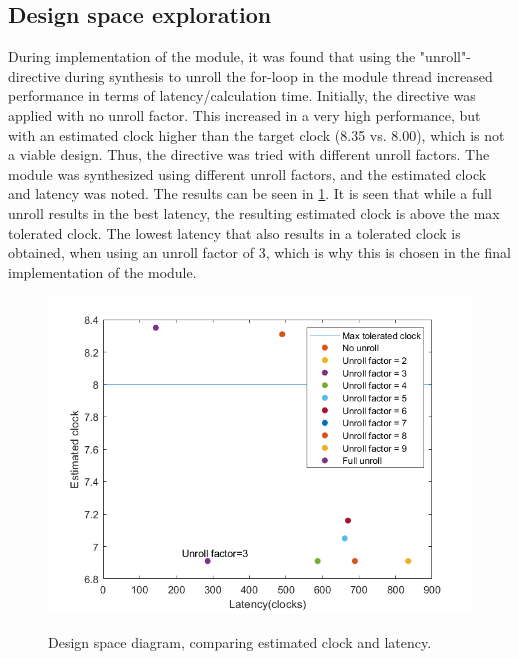 \subsection{Design space exploration}
During implementation of the module, it was found that using the "unroll"-directive during synthesis to unroll the for-loop in the module thread increased performance in terms of latency/calculation time. Initially, the directive was applied with no unroll factor. This increased in a very high performance, but with an estimated clock higher than the target clock (8.35 vs. 8.00), which is not a viable design. Thus, the directive was tried with different unroll factors. The module was synthesized using different unroll factors, and the estimated clock and latency was noted. The results can be seen in \cref{fig:design_space_diagram}. It is seen that while a full unroll results in the best latency, the resulting estimated clock is above the max tolerated clock. The lowest latency that also results in a tolerated clock is obtained, when using an unroll factor of 3, which is why this is chosen in the final implementation of the module.
\begin{figure}[H]
	\centering
	{\includegraphics[width=\textwidth/2]{Images/paerto_latency_clock.PNG}}\\[0.5cm]
	\caption{Design space diagram, comparing estimated clock and latency.}
	\label{fig:design_space_diagram}
\end{figure}